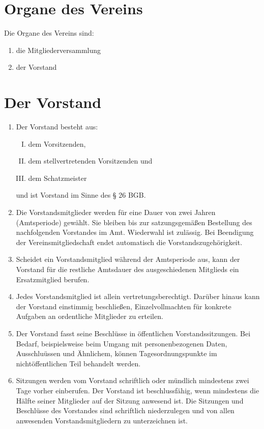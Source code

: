 \documentclass[12pt,a4paper,titlepage]{scrartcl}
\begin{document}
\section{Organe des Vereins}
Die Organe des Vereins sind:
\begin{enumerate}
\item die Mitgliederversammlung 
\item der Vorstand
\end{enumerate}

\section{Der Vorstand}
\begin{enumerate}
\item
Der Vorstand besteht aus:
\begin{enumerate}[I.]
\item dem Vorsitzenden,
\item dem stellvertretenden Vorsitzenden und
\item dem Schatzmeister
\end{enumerate}
und ist Vorstand im Sinne des § 26 BGB.
\item  Die Vorstandsmitglieder werden für eine Dauer von zwei Jahren (Amtsperiode) gewählt.
Sie bleiben bis zur satzungsgemäßen Bestellung des nachfolgenden Vorstandes im Amt. Wiederwahl ist zulässig. Bei Beendigung der Vereinsmitgliedschaft endet automatisch die Vorstandszugehörigkeit.
\item Scheidet ein Vorstandsmitglied während der Amtsperiode aus, kann der Vorstand für
die restliche Amtsdauer des ausgeschiedenen Mitglieds ein Ersatzmitglied berufen.
\item Jedes Vorstandsmitglied ist allein vertretungsberechtigt. Darüber hinaus kann der Vorstand einstimmig beschließen, Einzelvollmachten für konkrete Aufgaben an ordentliche Mitglieder zu erteilen.
\item Der Vorstand fasst seine Beschlüsse in öffentlichen Vorstandssitzungen. Bei Bedarf,
beispielsweise beim Umgang mit personenbezogenen Daten, Ausschluüssen und Ähnlichem,
können Tagesordnungspunkte im nichtöffentlichen Teil behandelt werden. 
\item Sitzungen werden vom Vorstand schriftlich oder mündlich mindestens zwei Tage vorher einberufen. Der Vorstand ist beschlussfähig, wenn mindestens die Hälfte seiner Mitglieder auf der Sitzung anwesend ist. Die Sitzungen und Beschlüsse des Vorstandes sind schriftlich niederzulegen und von allen anwesenden Vorstandsmitgliedern zu unterzeichnen ist.

\end{enumerate}
\end{document}
